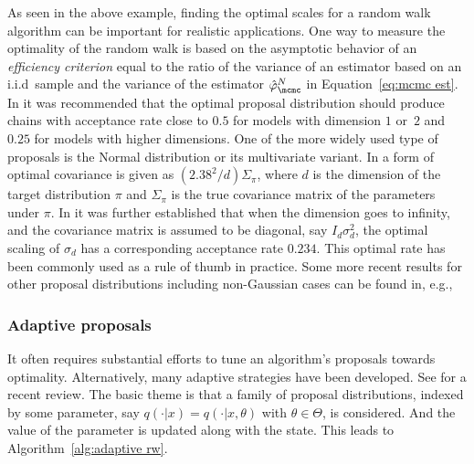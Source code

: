 As seen in the above example, finding the optimal scales for a random walk algorithm can be important for realistic applications. One way to measure the optimality of the random walk is based on the asymptotic behavior of an \emph{efficiency criterion} equal to the ratio of the variance of an estimator based on an i.i.d\ sample and the variance of the estimator $\hat\varphi_{\mcmc}^N$ in Equation~\eqref{eq:mcmc est}. In \cite{Roberts:1997dg} it was recommended that the optimal proposal distribution should produce chains with acceptance rate close to $0.5$ for models with dimension $1$ or~$2$ and~$0.25$ for models with higher dimensions. One of the more widely used type of proposals is the Normal distribution or its multivariate variant. In \cite{Gelman:1995vx} a form of optimal covariance is given as $(2.38^2/d)\Sigma_{\pi}$, where $d$ is the dimension of the target distribution $\pi$ and $\Sigma_{\pi}$ is the true covariance matrix of the parameters under $\pi$. In \cite{Roberts:2001ta} it was further established that when the dimension goes to infinity, and the covariance matrix is assumed to be diagonal, say $I_d\sigma_d^2$, the optimal scaling of $\sigma_d$ has a corresponding acceptance rate $0.234$. This optimal rate has been commonly used as a rule of thumb in practice. Some more recent results for other proposal distributions including non-Gaussian cases can be found in, e.g., \cite{Chris:2009vx,Peter:2011vx}

\subsubsection{Adaptive proposals}
\label{ssub:Adaptive proposals}

It often requires substantial efforts to tune an algorithm's proposals towards optimality. Alternatively, many adaptive strategies have been developed. See \cite{Andrieu:2008kh} for a recent review. The basic theme is that a family of proposal distributions, indexed by some parameter, say $q(\cdot|x) = q(\cdot|x, \theta)$ with $\theta\in\Theta$, is considered. And the value of the parameter is updated along with the state. This leads to Algorithm~\ref{alg:adaptive rw}.



